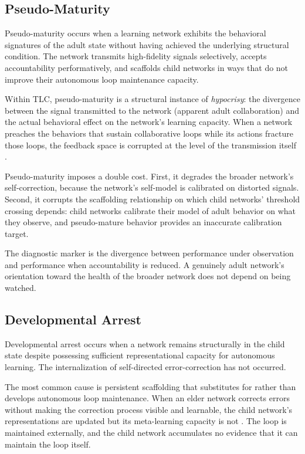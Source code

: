 \documentclass[11pt]{article}
\begin{document}
\subsection{Pseudo-Maturity}

Pseudo-maturity occurs when a learning network exhibits the behavioral signatures of the
adult state without having achieved the underlying structural condition. The network
transmits high-fidelity signals selectively, accepts accountability performatively, and
scaffolds child networks in ways that do not improve their autonomous loop maintenance
capacity.

Within TLC, pseudo-maturity is a structural instance of \emph{hypocrisy}: the divergence
between the signal transmitted to the network (apparent adult collaboration) and the actual
behavioral effect on the network's learning capacity. When a network preaches the behaviors
that sustain collaborative loops while its actions fracture those loops, the feedback space
is corrupted at the level of the transmission itself \cite{tlc2026}.

Pseudo-maturity imposes a double cost. First, it degrades the broader network's
self-correction, because the network's self-model is calibrated on distorted signals.
Second, it corrupts the scaffolding relationship on which child networks' threshold crossing
depends: child networks calibrate their model of adult behavior on what they observe, and
pseudo-mature behavior provides an inaccurate calibration target.

The diagnostic marker is the divergence between performance under observation and performance
when accountability is reduced. A genuinely adult network's orientation toward the health of
the broader network does not depend on being watched.

\subsection{Developmental Arrest}

Developmental arrest occurs when a network remains structurally in the child state despite
possessing sufficient representational capacity for autonomous learning. The internalization
of self-directed error-correction has not occurred.

The most common cause is persistent scaffolding that substitutes for rather than develops
autonomous loop maintenance. When an elder network corrects errors without making the
correction process visible and learnable, the child network's representations are updated but
its meta-learning capacity is not \cite{vygotsky1978}. The loop is maintained externally,
and the child network accumulates no evidence that it can maintain the loop itself.
\end{document}
